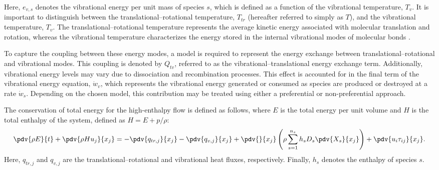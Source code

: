 Here, $e_{v,s}$ denotes the vibrational energy per unit mass of species $s$, which is defined as a function of the vibrational temperature, $T_v$. It is important to distinguish between the translational--rotational temperature, $T_{tr}$ (hereafter referred to simply as $T$), and the vibrational temperature, $T_v$. The translational--rotational temperature represents the average kinetic energy associated with molecular translation and rotation, whereas the vibrational temperature characterizes the energy stored in the internal vibrational modes of molecular bonds \citep{Vincenti1965}.

To capture the coupling between these energy modes, a model is required to represent the energy exchange between translational--rotational and vibrational modes. This coupling is denoted by $Q_{tv}$, referred to as the vibrational--translational energy exchange term. Additionally, vibrational energy levels may vary due to dissociation and recombination processes. This effect is accounted for in the final term of the vibrational energy equation, $\dot{w}_v$, which represents the vibrational energy generated or consumed as species are produced or destroyed at a rate $\dot{w}_s$. Depending on the chosen model, this contribution may be treated using either a preferential or non-preferential approach.


The conservation of total energy for the high-enthalpy flow is defined as follows, where $E$ is the total energy per unit volume and $H$ is the total enthalpy of the system, defined as $H = E + p/\rho$:
\begin{equation}\label{equation:global_total_energy}
\begin{split}
\pdv{\rho E}{t} + \pdv{\rho H u_j}{x_j}
= - \pdv{q_{tr,j}}{x_j}
  - \pdv{q_{v,j}}{x_j}
  + \pdv{}{x_j} \left( \rho \sum_{s=1}^{n_s} h_s D_s \pdv{X_s}{x_j} \right)
  + \pdv{u_i \tau_{ij}}{x_j}.
\end{split}
\end{equation}
Here, $q_{tr,j}$ and $q_{v,j}$ are the translational--rotational and vibrational heat fluxes, respectively. Finally, $h_s$ denotes the enthalpy of species $s$.







